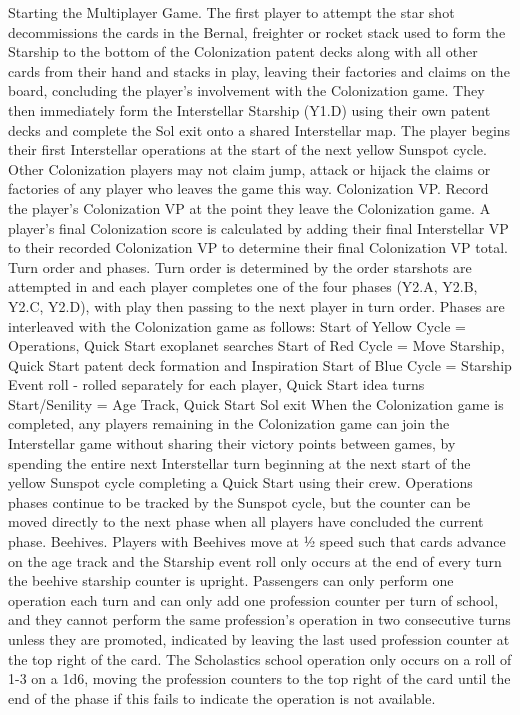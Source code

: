 \documentclass[a4paper]{book}
\begin{document}
Starting the Multiplayer Game. The first player to attempt the star shot decommissions the cards in the Bernal, freighter or rocket stack used to form the Starship to the bottom of the Colonization patent decks along with all other cards from their hand and stacks in play, leaving their factories and claims on the board, concluding the player’s involvement with the Colonization game. They then immediately form the Interstellar Starship (Y1.D) using their own patent decks and complete the Sol exit onto a shared Interstellar map. The player begins their first Interstellar operations at the start of the next yellow Sunspot cycle. Other Colonization players may not claim jump, attack or hijack the claims or factories of any player who leaves the game this way.
Colonization VP. Record the player’s Colonization VP at the point they leave the Colonization game. A player’s final Colonization score is calculated by adding their final Interstellar VP to their recorded Colonization VP to determine their final Colonization VP total.
Turn order and phases. Turn order is determined by the order starshots are attempted in and each player completes one of the four phases (Y2.A, Y2.B, Y2.C, Y2.D), with play then passing to the next player in turn order. Phases are interleaved with the Colonization game as follows:
Start of Yellow Cycle = Operations, Quick Start exoplanet searches
Start of Red Cycle = Move Starship, Quick Start patent deck formation and Inspiration
Start of Blue Cycle = Starship Event roll - rolled separately for each player, Quick Start idea turns
Start/Senility = Age Track, Quick Start Sol exit
When the Colonization game is completed, any players remaining in the Colonization game can join the Interstellar game without sharing their victory points between games, by spending the entire next Interstellar turn beginning at the next start of the yellow Sunspot cycle completing a Quick Start using their crew. Operations phases continue to be tracked by the Sunspot cycle, but the counter can be moved directly to the next phase when all players have concluded the current phase.
Beehives. Players with Beehives move at ½ speed such that cards advance on the age track and the Starship event roll only occurs at the end of every turn the beehive starship counter is upright. Passengers can only perform one operation each turn and can only add one profession counter per turn of school, and they cannot perform the same profession’s operation in two consecutive turns unless they are promoted, indicated by leaving the last used profession counter at the top right of the card. The Scholastics school operation only occurs on a roll of 1-3 on a 1d6, moving the profession counters to the top right of the card until the end of the phase if this fails to indicate the operation is not available.
\end{document}
